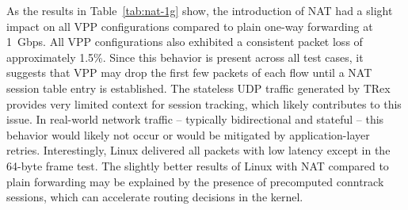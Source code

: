 As the results in Table~\ref{tab:nat-1g} show, the introduction of NAT had a slight impact on all VPP configurations compared to plain one-way forwarding at 1~Gbps.  
All VPP configurations also exhibited a consistent packet loss of approximately 1.5\%.
Since this behavior is present across all test cases, it suggests that VPP may drop the first few packets of each flow until a NAT session table entry is established.  
The stateless UDP traffic generated by TRex provides very limited context for session tracking, which likely contributes to this issue.  
In real-world network traffic -- typically bidirectional and stateful -- this behavior would likely not occur or would be mitigated by application-layer retries.
Interestingly, Linux delivered all packets with low latency except in the 64-byte frame test.  
The slightly better results of Linux with NAT compared to plain forwarding may be explained by the presence of precomputed conntrack sessions, which can accelerate routing decisions in the kernel.

